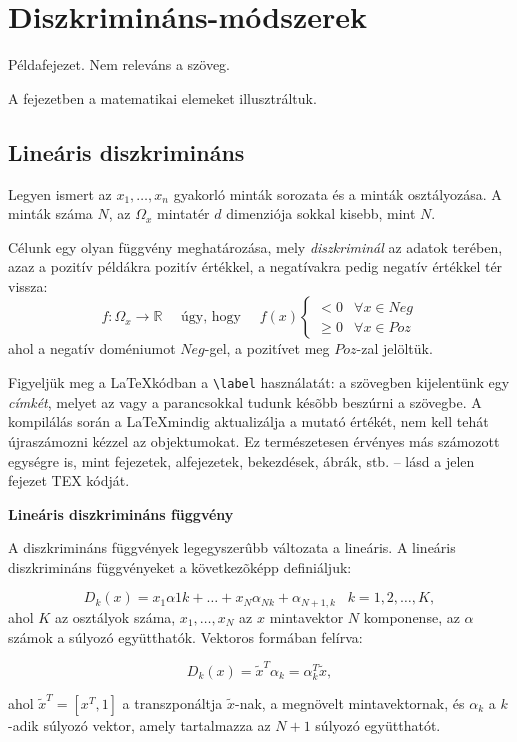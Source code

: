 \chapter{Diszkrimináns-módszerek}\label{ch:diszkr}

\begin{osszefoglal}
	Példafejezet. Nem releváns a szöveg.
	
	A fejezetben a matematikai elemeket illusztráltuk.
\end{osszefoglal}



\section{Lineáris diszkrimináns}

Legyen ismert az $x_1, \ldots , x_n$ gyakorló minták sorozata és a minták 
osztályozása. A minták száma $N$, az $\Omega_x$ mintatér $d$ dimenziója 
sokkal kisebb, mint $N$.

Célunk egy olyan függvény meghatározása, mely \emph{diszkriminál} az adatok terében, azaz a pozitív példákra pozitív értékkel, a negatívakra pedig negatív értékkel tér vissza:
\begin{equation}
	f: \Omega_x \rightarrow {\mathbb{R}}
	\quad\text{ úgy, hogy }
	\quad f(x)
	\begin{cases}
		<0 & \forall x\in Neg \\
		\geq 0 & \forall x\in Poz
	\end{cases}
	\label{eq:diszkr:fugg}
\end{equation}
ahol a negatív doméniumot $Neg$-gel, a pozitívet meg $Poz$-zal jelöltük.%

{\footnotesize
	Figyeljük meg a \LaTeX kódban a \verb!\label! használatát: a szövegben kijelentünk egy \emph{címkét}, melyet az \protect{\verb+\eqref{eq:diszkr:fugg}+} vagy a \protect{\verb+\ref{eq:diszkr:fugg}+} parancsokkal tudunk késõbb beszúrni a szövegbe.
  A kompilálás során a \LaTeX mindig aktualizálja a mutató értékét, nem kell tehát újraszámozni kézzel az objektumokat. Ez természetesen érvényes más számozott egységre is, mint fejezetek, alfejezetek, bekezdések, ábrák, stb. -- lásd a jelen fejezet TEX kódját.
}

{\bf Lineáris diszkrimináns függvény} 

A diszkrimináns függvények 
legegyszerûbb változata a lineáris. A lineáris diszkrimináns függvényeket a 
következõképp definiáljuk: 

$$D_k(x)=x_1\alpha{1k}+\ldots 
+x_N\alpha_{Nk}+\alpha_{N+1,k}\;\;\;k=1,2,\ldots ,K,$$ ahol $K$ az osztályok száma, $x_1, \ldots, x_N$ az $x$ 
mintavektor $N$ komponense, az $\alpha$ számok a súlyozó együtthatók. Vektoros 
formában felírva:

$$D_k(x)=\tilde{x}^T\alpha_k=\alpha_k^T\tilde{x},$$

ahol $\tilde{x}^T=[x^T,1]$ a transzponáltja $\tilde{x}$-nak, a 
megnövelt mintavektornak, és $\alpha_k$ a $k$-adik súlyozó vektor, amely 
tartalmazza az $N+1$ súlyozó együtthatót.